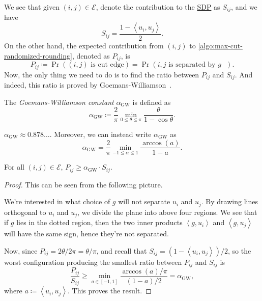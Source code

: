 We see that given \((i, j)\in \mathcal{E} \), denote the contribution to the \hyperref[eq:max-cut]{SDP} as \(S_{ij} \), and we have
\[
	S_{ij}= \frac{1 - \left\langle u_i, u_j \right\rangle }{2}.
\]
On the other hand, the expected contribution from \((i, j)\) to \autoref{algo:max-cut-randomized-rounding}, denoted as \(P_{ij} \), is
\[
	P_{ij}\coloneqq  \Pr((i, j)\text{ is cut edge} ) = \Pr(i, j \text{ is separated by \(g\) } ).
\]
Now, the only thing we need to do is to find the ratio between \(P_{ij} \) and \(S_{ij} \). And indeed, this ratio is proved by Goemans-Williamson~\cite{goemans1995improved}.

\begin{notation}[c]\label{not:GW}
	The \emph{Goemans-Williamson constant} \(\alpha _{\mathrm{GW} }\) is defined as
	\[
		\alpha _{\mathrm{GW} }\coloneqq \frac{2}{\pi }\min _{0 \leq \theta \leq \pi }\frac{\theta }{1 - \cos \theta }.
	\]
\end{notation}

\begin{remark}
	\(\alpha _{\mathrm{GW} }\approx 0.878\dots \). Moreover, we can instead write \(\alpha _\mathrm{GW} \) as
	\[
		\alpha _{\mathrm{GW} } = \frac{2}{\pi }\min _{-1\leq \alpha \leq 1} \frac{\arccos(a)}{1 - a}.
	\]
\end{remark}

\begin{lemma}\label{lma:lec14-2}
	For all \((i, j)\in \mathcal{E} \), \(P_{ij} \geq \alpha _{\mathrm{GW} } \cdot S_{ij} \).
\end{lemma}
\begin{proof}
	This can be seen from the following picture.
	\begin{center}
	\end{center}
	We're interested in what choice of \(g\) will not separate \(u_i\) and \(u_j\). By drawing lines orthogonal to \(u_i\) and \(u_j\), we divide the plane into above four regions. We see that if \(g\) lies in the dotted region, then the two inner products \(\left\langle g, u_i \right\rangle \) and \(\left\langle g, u_j \right\rangle \) will have the same sign, hence they're not separated.

	Now, since \(P_{ij} = 2\theta / 2\pi = \theta / \pi\), and recall that \(S_{ij} = (1 - \left\langle u_i, u_j \right\rangle) / 2 \), so the worst configuration producing the smallest ratio between \(P_{ij} \) and \(S_{ij} \) is
	\[
		\frac{P_{ij}}{S_{ij} } \geq \min _{a\in [-1, 1]} \frac{\arccos(a) / \pi }{(1-a) / 2} = \alpha _\mathrm{GW},
	\]
	where \(a \coloneqq \left\langle u_i, u_j \right\rangle\). This proves the result.
\end{proof}

